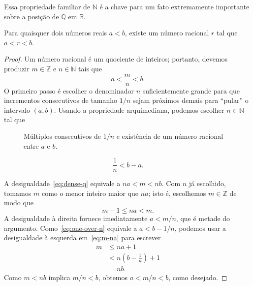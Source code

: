 Essa propriedade familiar de $\mathbb{N}$ é a chave para um fato extremamente importante sobre a posição de $\mathbb{Q}$ em $\mathbb{R}$.

 
\begin{theorem}\label{thm:dense-q-r}
Para quaisquer dois números reais $a<b$, existe um número racional $r$ tal que $a<r<b$.
\end{theorem}

\begin{proof}
Um número racional é um quociente de inteiros; portanto, devemos produzir $m\in\mathbb{Z}$ e $n\in\mathbb{N}$ tais que
\[
a<\frac{m}{n}<b.\tag{5}\label{eq:dense-q}
\]
O primeiro passo é escolher o denominador $n$ suficientemente grande para que incrementos consecutivos de tamanho $1/n$ sejam próximos demais para ``pular'' o intervalo $(a,b)$. Usando a propriedade arquimediana, podemos escolher $n\in\mathbb{N}$ tal que
\begin{figure}[htbp]
  \centering
  \caption{Múltiplos consecutivos de $1/n$ e existência de um número racional entre $a$ e $b$.}
  \label{fig:densidade-racionais-reta}
\end{figure}

\[
\frac{1}{n}<b-a.\tag{6}\label{eq:one-over-n}
\]

A desigualdade~\eqref{eq:dense-q} equivale a $na<m<nb$. Com $n$ já escolhido, tomamos $m$ como o menor inteiro maior que $na$; isto é, escolhemos $m\in\mathbb{Z}$ de modo que
\[
m-1\leq na<m.\tag{7}\label{eq:m-na}
\]
A desigualdade à direita fornece imediatamente $a<m/n$, que é metade do argumento. Como~\eqref{eq:one-over-n} equivale a $a<b-1/n$, podemos usar a desigualdade à esquerda em~\eqref{eq:m-na} para escrever
\[
\begin{aligned}
m&\leq na+1\\
 &<n\left(b-\frac{1}{n}\right)+1\\
 &=nb.
\end{aligned}
\]
Como $m<nb$ implica $m/n<b$, obtemos $a<m/n<b$, como desejado.
\end{proof}

